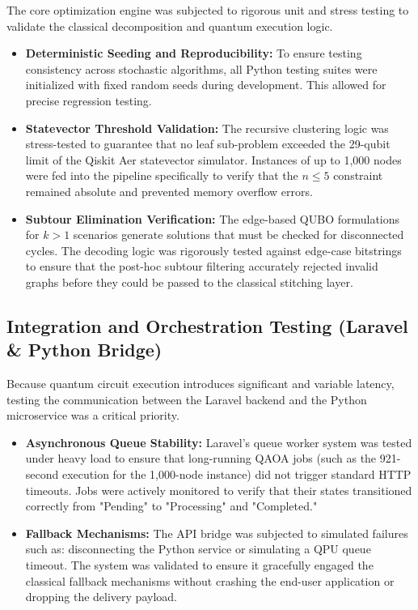 \documentclass[a4paper]{report}
\begin{document}
{\begin{itemize}
\begin{itemize}
The core optimization engine was subjected to rigorous unit and stress testing to validate the classical decomposition and quantum execution logic.

\begin{itemize}
    \item \textbf{Deterministic Seeding and Reproducibility:} To ensure testing consistency across stochastic algorithms, all Python testing suites were initialized with fixed random seeds during development. This allowed for precise regression testing.
    \item \textbf{Statevector Threshold Validation:} The recursive clustering logic was stress-tested to guarantee that no leaf sub-problem exceeded the 29-qubit limit of the Qiskit Aer statevector simulator. Instances of up to 1,000 nodes were fed into the pipeline specifically to verify that the $n \le 5$ constraint remained absolute and prevented memory overflow errors.
    \item \textbf{Subtour Elimination Verification:} The edge-based QUBO formulations for $k > 1$ scenarios generate solutions that must be checked for disconnected cycles. The decoding logic was rigorously tested against edge-case bitstrings to ensure that the post-hoc subtour filtering accurately rejected invalid graphs before they could be passed to the classical stitching layer.
\end{itemize}

\subsection{Integration and Orchestration Testing (Laravel \& Python Bridge)}

Because quantum circuit execution introduces significant and variable latency, testing the communication between the Laravel backend and the Python microservice was a critical priority.

\begin{itemize}
    \item \textbf{Asynchronous Queue Stability:} Laravel's queue worker system was tested under heavy load to ensure that long-running QAOA jobs (such as the 921-second execution for the 1,000-node instance) did not trigger standard HTTP timeouts. Jobs were actively monitored to verify that their states transitioned correctly from "Pending" to "Processing" and "Completed."
    \item \textbf{Fallback Mechanisms:} The API bridge was subjected to simulated failures such as: disconnecting the Python service or simulating a QPU queue timeout. The system was validated to ensure it gracefully engaged the classical fallback mechanisms without crashing the end-user application or dropping the delivery payload.
\end{itemize}




\end{itemize}
\end{itemize}}
\end{document}
